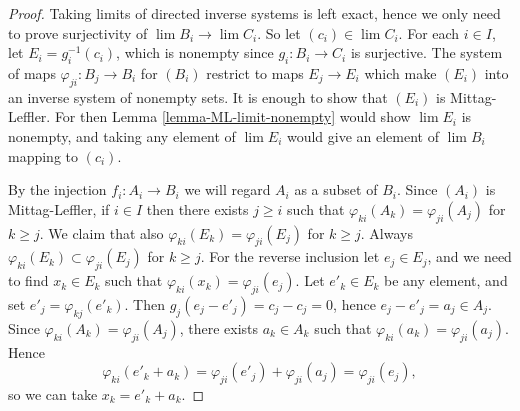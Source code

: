\begin{proof}
Taking limits of directed inverse systems is left exact, hence we only need to
prove surjectivity of $\lim B_i \to \lim C_i$.  So let $(c_i) \in \lim
C_i$.  For each $i \in I$, let $E_i = g_i^{-1}(c_i)$, which is nonempty since
$g_i: B_i \to C_i$ is surjective. The system of maps $\varphi_{ji}: B_j
\to B_i$ for $(B_i)$ restrict to maps $E_j \to E_i$ which
make $(E_i)$ into an inverse system of nonempty sets.  It is enough to show
that $(E_i)$ is Mittag-Leffler. For then Lemma \ref{lemma-ML-limit-nonempty}
would show $\lim E_i$ is nonempty, and taking any element of $\lim E_i$ would
give an element of $\lim B_i$ mapping to $(c_i)$.

\medskip\noindent
By the injection $f_i: A_i \to B_i$ we will regard $A_i$ as a subset of
$B_i$.  Since $(A_i)$ is Mittag-Leffler, if $i \in I$ then there exists $j \geq
i$ such that $\varphi_{ki}(A_k) = \varphi_{ji}(A_j)$ for $k \geq j$.  We claim
that also $\varphi_{ki}(E_k) = \varphi_{ji}(E_j)$ for $k \geq j$.  Always
$\varphi_{ki}(E_k) \subset \varphi_{ji}(E_j)$ for $k \geq j$.  For the reverse
inclusion let $e_j \in E_j$, and we need to find $x_k \in E_k$ such that
$\varphi_{ki}(x_k) = \varphi_{ji}(e_j)$.  Let $e'_k \in E_k$ be any element,
and set $e'_j = \varphi_{kj}(e'_k)$.  Then $g_j(e_j - e'_j) = c_j - c_j = 0$,
hence $e_j - e'_j = a_j \in A_j$.  Since $\varphi_{ki}(A_k) =
\varphi_{ji}(A_j)$, there exists $a_k \in A_k$ such that $\varphi_{ki}(a_k) =
\varphi_{ji}(a_j)$.  Hence
$$
\varphi_{ki}(e'_k + a_k) = \varphi_{ji}(e'_j) + \varphi_{ji}(a_j) =
\varphi_{ji}(e_j),
$$
so we can take $x_k = e'_k + a_k$.
\end{proof}




